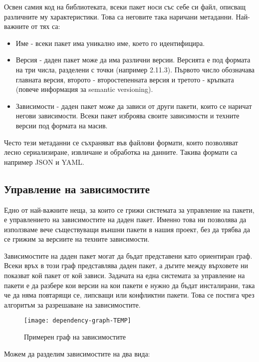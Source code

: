 Освен самия код на библиотеката, всеки пакет носи със себе си файл, описващ
различните му характеристики. Това са неговите така наричани метаданни.
Най-важните от тях са:

\begin{itemize}
    \item Име - всеки пакет има уникално име, което го идентифицира.
    \item Версия - даден пакет може да има различни версии. Версията е под
          формата на три числа, разделени с точки (например 2.11.3). Първото
          число обозначава главната версия, второто - второстепенната версия и
          третото - кръпката (повече информация за semantic versioning).
    \item Зависимости - даден пакет може да зависи от други пакети, които се
          наричат негови зависимости. Всеки пакет изброява своите зависимости и
          техните версии под формата на масив.
\end{itemize}

Често тези метаданни се съхраняват във файлови формати, които позволяват лесно
сериализиране, извличане и обработка на данните. Такива формати са например JSON
и YAML.


\subsection{Управление на зависимостите}

Едно от най-важните неща, за които се грижи системата за управление на пакети, е
управлението на зависимостите на даден пакет. Именно това ни позволява да
използваме вече съществуващи външни пакети в нашия проект, без да трябва да се
грижим за версиите на техните зависимости.

Зависимостите на даден пакет могат да бъдат представени като ориентиран граф.
Всеки връх в този граф представлява даден пакет, а дъгите между върховете ни
показват кой пакет от кой зависи. Задачата на една системата за управление на
пакети е да разбере кои версии на кои пакети е нужно да бъдат инсталирани, така
че да няма повтарящи се, липсващи или конфликтни пакети. Това се постига чрез
алгоритъм за разрешаване на зависимостите.

\begin{figure}[h]
    \centering
    \texttt{[image: dependency-graph-TEMP]}
    \caption{Примерен граф на зависимостите}
\end{figure}

Можем да разделим зависимостите на два вида:

